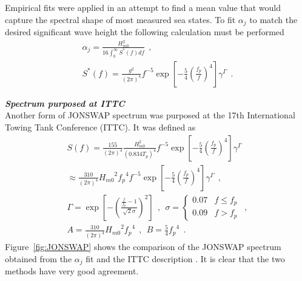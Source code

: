 Empirical fits were applied in an attempt to find a mean value that would capture the spectral shape of most measured sea states. To fit $\alpha_{j}$ to match the desired significant wave height the following calculation must be performed
\begin{eqnarray}
&\alpha_{j} = \frac{H_{m0}^{2}}{16\int_{0}^{\infty} S^{*} \left( f \right) df}~~,&\\
& S^{*}\left( f \right) = \frac{ g^{2} }{ (2\pi)^{4}} f^{-5}\exp\left[-\frac{5}{4} \left( \frac{f_{p}}{f}\right)^{4} \right]\gamma^\Gamma ~~. &
\end{eqnarray}

\textbf{\textit{Spectrum purposed at ITTC}}\\
Another form of JONSWAP spectrum was purposed at the 17th International Towing Tank Conference (ITTC). It was defined as
\begin{eqnarray}
& S\left( f \right) = \frac{155 }{ \left( 2\pi \right)^{4}} \frac{H_{m0}^{2}}{(0.834T_{p})^{4}} f^{-5}\exp\left[-\frac{5}{4} \left( \frac{f_{p}}{f}\right)^{4} \right]\gamma^\Gamma \nonumber & \\ 
& \approx \frac{310 }{ \left( 2\pi \right)^{4}} {H_{m0}}^{2} {f_{p}}^{4} f^{-5}\exp\left[-\frac{5}{4} \left( \frac{f_{p}}{f}\right)^{4} \right]\gamma^\Gamma~~, &\\
&\Gamma = \exp \left[ -\left( \frac{\frac{f}{f_{p}}-1}{\sqrt{2} \sigma}\right)^{2} \right]~~,~~ \sigma = \begin{cases} 0.07 & f \leq f_{p} \\ 
                                          0.09 & f > f_{p} \end{cases} ~~, \\
& A =\frac{310 }{ \left( 2\pi \right)^{4}} {H_{m0}}^{2} {f_{p}}^{4}~~, ~~ B = \frac{5}{4} {f_{p}}^{4}~~. &
\end{eqnarray}
Figure~\ref{fig:JONSWAP} shows the comparison of the JONSWAP spectrum obtained from the $\alpha_{j}$ fit and the ITTC description .  It is clear that the two methods have very good agreement.

